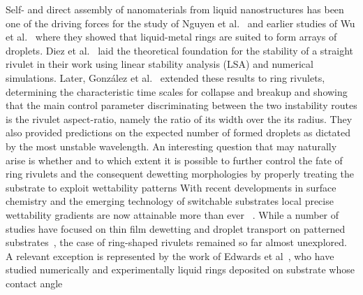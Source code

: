 \documentclass[twoside,twocolumn,9pt]{article}
\begin{document}
Self- and direct assembly of nanomaterials from liquid nanostructures has been one of the driving forces for the study of Nguyen et al.~\cite{nguyenCompetitionCollapseBreakup2012} and earlier studies of Wu et al.~\cite{wuBreakupPatternedNanoscale2010} where they showed that liquid-metal rings are suited to form arrays of droplets.
Diez et al.~\cite{diezBreakupFluidRivulets2009, diezStabilityFinitelengthRivulet2009} laid the theoretical foundation for the stability of a straight rivulet in their work using linear stability analysis (LSA) and numerical simulations. 
Later, Gonz{\'a}lez et al.~\cite{gonzalezStabilityLiquidRing2013} extended these results to ring rivulets, determining the characteristic time scales for collapse and breakup and showing that the main control parameter
discriminating between the two instability routes is the rivulet aspect-ratio, namely the ratio of its 
width over the its radius.
They also provided predictions on the expected number 
of formed droplets as dictated by the most unstable wavelength.
An interesting question that may naturally arise is whether and to which extent it is possible to further 
control the fate of ring rivulets and the consequent dewetting morphologies by properly treating the substrate
to exploit wettability patterns 
With recent developments in surface chemistry and the emerging technology of switchable substrates
local precise wettability gradients are now attainable more than ever~\cite{xinReversiblySwitchableWettability2010, stuartEmergingApplicationsStimuliresponsive2010,chenThermalresponsiveHydrogelSurface2010, ichimuraLightDrivenMotionLiquids2000, mugeleElectrowettingConvenientWay2005, edwardsControllingBreakupToroidal2021} .
While a number of studies have focused on thin film dewetting and droplet transport on patterned substrates~\cite{liuActuatingWaterDroplets2015,grawitterSteeringDropletsSubstrates2021, zitzControllingDewettingMorphologies2023}, the case of ring-shaped rivulets remained so far almost unexplored.
A relevant exception is represented by the work of Edwards et al~\cite{edwardsControllingBreakupToroidal2021},
who have studied numerically and experimentally liquid rings deposited on substrate whose contact angle 
\end{document}
